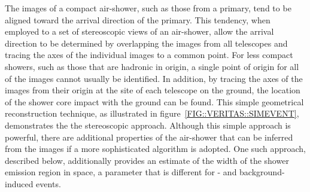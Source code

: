 The images of a compact air-shower, such as those from a \Gray
primary, tend to be aligned toward the arrival direction of the
primary. This tendency, when employed to a set of stereoscopic views
of an air-shower, allow the arrival direction to be determined by
overlapping the images from all telescopes and tracing the axes of the
individual images to a common point. For less compact showers, such as
those that are hadronic in origin, a single point of origin for all of
the images cannot usually be identified. In addition, by tracing the
axes of the images from their origin at the site of each telescope on
the ground, the location of the shower core impact with the ground can
be found. This simple geometrical reconstruction technique, as
illustrated in figure~\ref{FIG::VERITAS::SIMEVENT}, demonstrates the
the stereoscopic approach. Although this simple approach is powerful,
there are additional properties of the air-shower that can be inferred
from the images if a more sophisticated algorithm is adopted. One such
approach, described below, additionally provides an estimate of the
width of the shower emission region in space, a parameter that is
different for \Grayc- and background-induced events.

